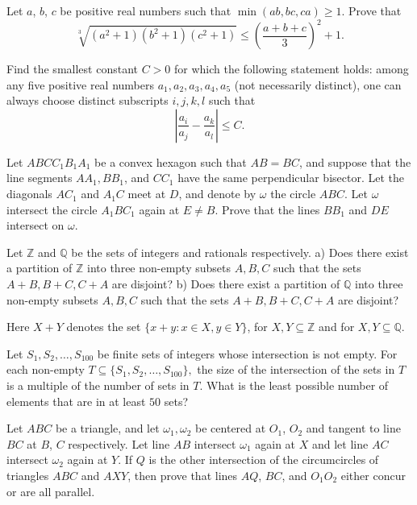 \documentclass[11pt]{scrartcl}
\begin{document}
\begin{problem}[4381532748791402633]
Let $a$, $b$, $c$ be positive real numbers such that $\min(ab,bc,ca) \ge 1$. Prove that$$\sqrt[3]{(a^2+1)(b^2+1)(c^2+1)} \le \left(\frac{a+b+c}{3}\right)^2 + 1.$$
\end{problem}
\begin{problem}[4190798556185983491]
Find the smallest constant $C > 0$ for which the following statement holds: among any five positive real numbers $a_1,a_2,a_3,a_4,a_5$ (not necessarily distinct), one can always choose distinct subscripts $i,j,k,l$ such that
\[ \left| \frac{a_i}{a_j} - \frac {a_k}{a_l} \right| \le C. \]
\end{problem}
\begin{problem}[5073004669687570949]
	Let $ABCC_1B_1A_1$ be a convex hexagon such that $AB=BC$, and suppose that the line segments $AA_1, BB_1$, and $CC_1$ have the same perpendicular bisector. Let the diagonals $AC_1$ and $A_1C$ meet at $D$, and denote by $\omega$ the circle $ABC$. Let $\omega$ intersect the circle $A_1BC_1$ again at $E \neq B$. Prove that the lines $BB_1$ and $DE$ intersect on $\omega$.
\end{problem}
\begin{problem}[810041368501810]
Let $\mathbb{Z}$ and $\mathbb{Q}$ be the sets of integers and rationals respectively.
a) Does there exist a partition of $\mathbb{Z}$ into three non-empty subsets $A,B,C$ such that the sets $A+B, B+C, C+A$ are disjoint?
b) Does there exist a partition of $\mathbb{Q}$ into three non-empty subsets $A,B,C$ such that the sets $A+B, B+C, C+A$ are disjoint?

Here $X+Y$ denotes the set $\{ x+y : x \in X, y \in Y \}$, for $X,Y \subseteq \mathbb{Z}$ and for $X,Y \subseteq \mathbb{Q}$.
\end{problem}
\begin{problem}[1978345856029698287]
Let $S_1, S_2, \ldots, S_{100}$ be finite sets of integers whose intersection is not empty. For each non-empty $T \subseteq \{S_1, S_2, \ldots, S_{100}\},$ the size of the intersection of the sets in $T$ is a multiple of the number of sets in $T$. What is the least possible number of elements that are in at least $50$ sets?
\end{problem}
\begin{problem}[4785409545704689551]
	Let $ABC$ be a triangle, and let $\omega_1,\omega_2$ be centered at $O_1$, $O_2$ and tangent to line $BC$ at $B$, $C$ respectively. Let line $AB$ intersect $\omega_1$ again at $X$ and let line $AC$ intersect $\omega_2$ again at $Y$. If $Q$ is the other intersection of the circumcircles of triangles $ABC$ and $AXY$, then prove that lines $AQ$, $BC$, and $O_1O_2$ either concur or are all parallel.
\end{problem}
\end{document}
